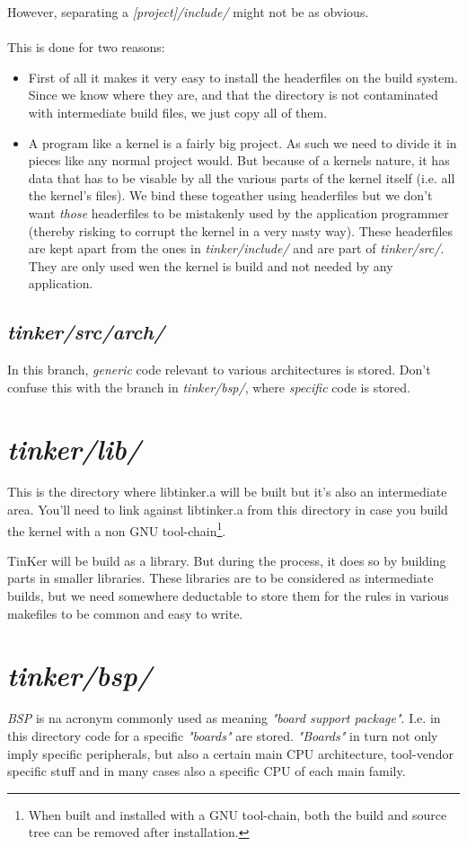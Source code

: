 However, separating a \textit{[project]/include/} might not be as obvious.
\\\\
This is done for two reasons:
\begin{itemize}
	\item First of all it makes it very easy to install the headerfiles on the build system. Since we know where they are, and that the directory is not contaminated with intermediate build files, we just copy all of them.
	\item A program like a kernel is a fairly big project. As such we need to divide it in pieces like any normal project would. But because of a kernels nature, it has data that has to be visable by all the various parts of the kernel itself (i.e. all the kernel's files). We bind these togeather using headerfiles but we don't want \textit{those} headerfiles to be mistakenly used by the application programmer (thereby risking to corrupt the kernel in a very nasty way). These headerfiles are kept apart from the ones in \textit{tinker/include/} and are part of \textit{tinker/src/}. They are only used wen the kernel is build and not needed by any application.
\end{itemize}
\subsection{\textit{tinker/src/arch/}}
In this branch, \textit{generic} code relevant to various architectures is stored. Don't confuse this with the branch in \textit{tinker/bsp/}, where \textit{specific} code is stored.

\section{\textit{tinker/lib/}}
This is the directory where libtinker.a will be built but it's also an intermediate area. You'll need to link against libtinker.a from this directory in case you build the kernel with a non GNU tool-chain\footnote{When built and installed with a GNU tool-chain, both the build and source tree can be removed after installation.}.

TinKer will be build as a library. But during the process, it does so by building parts in smaller libraries. These libraries are to be considered as intermediate builds, but we need somewhere deductable to store them for the rules in various makefiles to be common and easy to write.

\section{\textit{tinker/bsp/}}
\textit{BSP} is na acronym commonly used as meaning \textit{"board support package"}. I.e. in this directory code for a specific \textit{"boards"} are stored. \textit{"Boards"} in turn not only imply specific peripherals, but also a certain main CPU architecture, tool-vendor specific stuff and in many cases also a specific CPU of each main family. 

